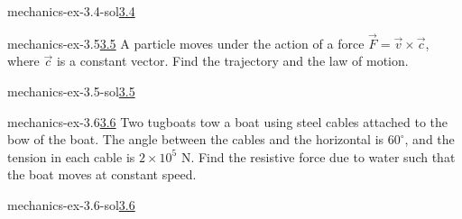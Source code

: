 \documentclass[preview]{standalone}
\begin{document}
\begin{snippetsolution}{mechanics-ex-3.4-sol}{\underline{3.4}}
    \todo
\end{snippetsolution}

\begin{snippetexercise}{mechanics-ex-3.5}{\underline{3.5}}
    A particle moves under the action of a force $\vec{F} = \vec{v} \times \vec{c}$, where $\vec{c}$ is a constant vector. Find the trajectory and the law of motion.
\end{snippetexercise}

\begin{snippetsolution}{mechanics-ex-3.5-sol}{\underline{3.5}}
    \todo
\end{snippetsolution}

\begin{snippetexercise}{mechanics-ex-3.6}{\underline{3.6}}
    Two tugboats tow a boat using steel cables attached to the bow of the boat. The angle between the cables and the horizontal is $60^\circ$, and the tension in each cable is $2 \times 10^5$ N. Find the resistive force due to water such that the boat moves at constant speed.
\end{snippetexercise}

\begin{snippetsolution}{mechanics-ex-3.6-sol}{\underline{3.6}}
    \todo
\end{snippetsolution}
\end{document}
